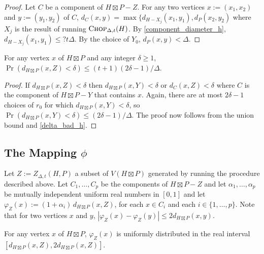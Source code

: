 \documentclass{patmorin}
\begin{document}
\begin{proof}
  Let $C$ be a component of $H\boxtimes P-Z$.  For any two vertices $x:=(x_1,x_2)$ and $y:=(y_1,y_2)$ of $C$, $d_{C}(x,y) = \max\{d_{H-X_j}(x_1,y_1),d_{P}(x_2,y_2)$ where $X_j$ is the result of running $\textsc{Chop}_{\Delta,t}(H)$. By \cref{component_diameter_h},  $d_{H-X_j}(x_1,y_1)\le ?t\Delta$.  By the choice of $Y_0$, $d_{P}(x,y)<\Delta$.
\end{proof}



\begin{lem}\label{delta_bad_product}
  For any vertex $x$ of $H\boxtimes P$ and any integer $\delta\ge 1$, $\Pr(d_{H\boxtimes P}(x,Z)< \delta)\le (t+1)(2\delta-1)/\Delta$.
\end{lem}

\begin{proof}
  If $d_{H\boxtimes P}(x,Z)<\delta$ then $d_{H\boxtimes P}(x,Y)<\delta$ or $d_{C}(x,Z)<\delta$ where $C$ is the component of $H\boxtimes P-Y$ that contains $x$.  Again, there are at most $2\delta-1$ choices of $r_0$ for which $d_{H\boxtimes P}(x,Y)<\delta$, so $\Pr(d_{H\boxtimes P}(x,Y)<\delta)\le (2\delta-1)/\Delta$.  The proof now follows from the union bound and \cref{delta_bad_h}.
\end{proof}

%
%

\subsection{\boldmath The Mapping $\phi$}

Let $Z:=Z_{\Delta,t}(H,P)$ a subset of $V(H\boxtimes P)$ generated by running the procedure described above.  Let $C_1,\ldots,C_p$ be the components of $H\boxtimes P-Z$ and let $\alpha_1,\ldots,\alpha_p$ be mutually independent uniform real numbers in $[0,1]$ and let $\varphi_Z(x):=(1+\alpha_i)\,d_{H\boxtimes P}(x,Z)$, for each $x\in C_i$ and each $i\in\{1,\ldots,p\}$.  Note that for two vertices $x$ and $y$, $|\varphi_Z(x)-\varphi_Z(y)|\le 2d_{H\boxtimes P}(x,y)$.

\begin{obs}\label{uniform}
  For any vertex $x$ of $H\boxtimes P$, $\varphi_Z(x)$ is uniformly distributed in the real interval $[d_{H\boxtimes P}(x,Z), 2d_{H\boxtimes P}(x,Z)]$.
\end{obs}
\end{document}
